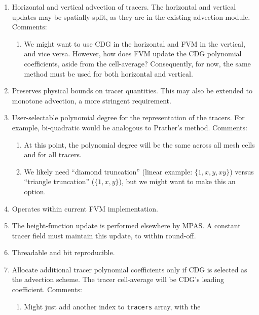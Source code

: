 \documentclass[11pt]{report}
\begin{document}
\begin{enumerate}
	\item Horizontal and vertical advection of tracers.  The horizontal
          and vertical updates may be spatially-split, as they are in the
          existing advection module.  Comments:
          \begin{enumerate}
          \item We might want to use CDG in the horizontal and FVM in the
            vertical, and vice versa. However, how does FVM update the CDG
            polynomial coefficients, aside from the cell-average?
            Consequently, for now, the same method must be used for both
            horizontal and vertical.
          \end{enumerate}
	\item Preserves physical bounds on tracer quantities.  This may also
          be extended to monotone advection, a more stringent requirement.
        \item User-selectable polynomial degree for the representation of the
          tracers.  For example, bi-quadratic would be analogous to Prather's
          method.
            Comments:
          \begin{enumerate}
          \item  At this point, the polynomial degree will be the same
          across all mesh cells and for all tracers.
          \item We likely need ``diamond truncation'' (linear example:
            $\{1,x,y,xy\}$) versus ``triangle truncation'' ($\{1,x,y\}$), but
            we might want to make this an option.
          \end{enumerate}
        \item Operates within current FVM implementation.
        \item The height-function update is performed elsewhere by MPAS.  A
          constant tracer field must maintain this update, to within
          round-off. \label{req:constantq}
        \item Threadable and bit reproducible.
          \label{req:thread}
        \item Allocate additional tracer polynomial coefficients only if CDG is
          selected as the advection scheme.  The tracer cell-average will be CDG's
          leading coefficient. \label{req:cell_avg}
          Comments:
          \begin{enumerate}
          \item Might just add another index to {\tt tracers} array, with the

\end{enumerate}
\end{enumerate}
\end{document}
